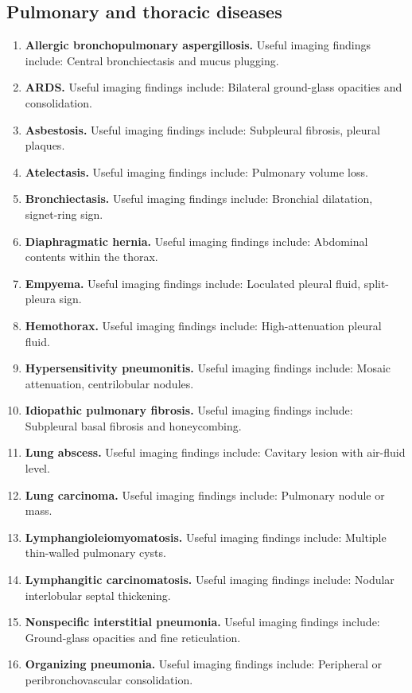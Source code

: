 \subsection{Pulmonary and thoracic diseases}
\begin{enumerate}[leftmargin=*,itemsep=0.45em,topsep=0.4em]
\item \textbf{Allergic bronchopulmonary aspergillosis.} Useful imaging findings include: Central bronchiectasis and mucus plugging.
\item \textbf{ARDS.} Useful imaging findings include: Bilateral ground-glass opacities and consolidation.
\item \textbf{Asbestosis.} Useful imaging findings include: Subpleural fibrosis, pleural plaques.
\item \textbf{Atelectasis.} Useful imaging findings include: Pulmonary volume loss.
\item \textbf{Bronchiectasis.} Useful imaging findings include: Bronchial dilatation, signet-ring sign.
\item \textbf{Diaphragmatic hernia.} Useful imaging findings include: Abdominal contents within the thorax.
\item \textbf{Empyema.} Useful imaging findings include: Loculated pleural fluid, split-pleura sign.
\item \textbf{Hemothorax.} Useful imaging findings include: High-attenuation pleural fluid.
\item \textbf{Hypersensitivity pneumonitis.} Useful imaging findings include: Mosaic attenuation, centrilobular nodules.
\item \textbf{Idiopathic pulmonary fibrosis.} Useful imaging findings include: Subpleural basal fibrosis and honeycombing.
\item \textbf{Lung abscess.} Useful imaging findings include: Cavitary lesion with air-fluid level.
\item \textbf{Lung carcinoma.} Useful imaging findings include: Pulmonary nodule or mass.
\item \textbf{Lymphangioleiomyomatosis.} Useful imaging findings include: Multiple thin-walled pulmonary cysts.
\item \textbf{Lymphangitic carcinomatosis.} Useful imaging findings include: Nodular interlobular septal thickening.
\item \textbf{Nonspecific interstitial pneumonia.} Useful imaging findings include: Ground-glass opacities and fine reticulation.
\item \textbf{Organizing pneumonia.} Useful imaging findings include: Peripheral or peribronchovascular consolidation.

\end{enumerate}
